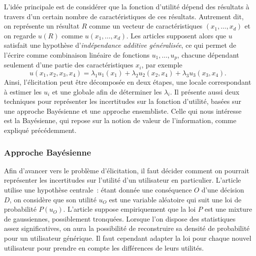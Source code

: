 \documentclass[a4paper,11pt]{article}
\theoremstyle{plain}
\begin{document}
L'idée principale est de considérer que la fonction d'utilité dépend des résultats à travers d'un certain nombre de caractéristiques de ces résultats. Autrement dit, on représente un résultat $R$ comme un vecteur de caractéristiques $(x_1, \dotsc, x_d)$ et on regarde $u(R)$ comme $u(x_1, \dotsc, x_d)$. Les articles \cite{Braziunas_2008, braziunas_local_2005} supposent alors que $u$ satisfait une hypothèse d'\emph{indépendance additive généralisée}, ce qui permet de l'écrire comme combinaison linéaire de fonctions $u_1, \dotsc, u_p$, chacune dépendant seulement d'une partie des caractéristiques $x_i$, par exemple
\begin{equation}
\label{IndependanceAdditiveGeneralisee}
u(x_1, x_2, x_3, x_4) = \lambda_1 u_1(x_1) + \lambda_2 u_2(x_2, x_4) + \lambda_3 u_3(x_3, x_4).
\end{equation}
Ainsi, l'élicitation peut être décomposée en deux étapes, une locale correspondant à estimer les $u_i$ et une globale afin de déterminer les $\lambda_i$. Il présente aussi deux techniques pour représenter les incertitudes sur la fonction d'utilité, basées sur une approche Bayésienne et une approche ensembliste. Celle qui nous intéresse est la Bayésienne, qui repose sur la notion de valeur de l'information, comme expliqué précédemment.

\subsubsection{Approche Bayésienne}

Afin d'avancer vers le problème d'élicitation, il faut décider comment on pourrait représenter les incertitudes sur l'utilité d'un utilisateur en particulier. L'article \cite{chajewska_making_2000} utilise une hypothèse centrale~: étant donnée une conséquence $O$ d'une décision $D$, on considère que son utilité $u_O$ est une variable aléatoire qui suit une loi de probabilité $P(u_O)$. L'article suppose empiriquement que la loi $P$ %
est une mixture de gaussiennes, possiblement tronquées. Lorsque l'on dispose des statistiques assez significatives, on aura la possibilité de reconstruire sa densité de probabilité pour un utilisateur générique. Il faut cependant adapter la loi pour chaque nouvel utilisateur pour prendre en compte les différences de leurs utilités.
\end{document}
